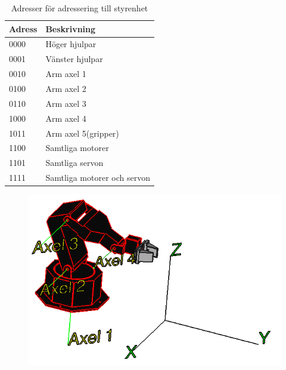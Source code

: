 \begin{table}[h]
	\centering
		\begin{tabularx}{\textwidth}{| l | X |}
			\hline
			\textbf{Adress} & \textbf{Beskrivning} \\
			\hline
			{0000} & {Höger hjulpar} \\
			\hline
			{0001} & {Vänster hjulpar} \\
			\hline
			{0010} & {Arm axel 1} \\ %
			\hline
			{0100} & {Arm axel 2} \\
			\hline
			{0110} & {Arm axel 3} \\
			\hline
			{1000} & {Arm axel 4} \\
			\hline
			{1011} & {Arm axel 5(gripper)} \\ %
			\hline
			{1100} & {Samtliga motorer} \\
			\hline
			{1101} & {Samtliga servon} \\
			\hline
			{1111} & {Samtliga motorer och servon} \\
			\hline
		\end{tabularx}
	\caption{Adresser för adressering till styrenhet} \label{protokoll:pc-motor-adress-tabell}
\end{table}

\begin{figure}[h]
\centerline{\includegraphics[scale=0.4]{robotaxis}}
\caption{}
\end{figure}